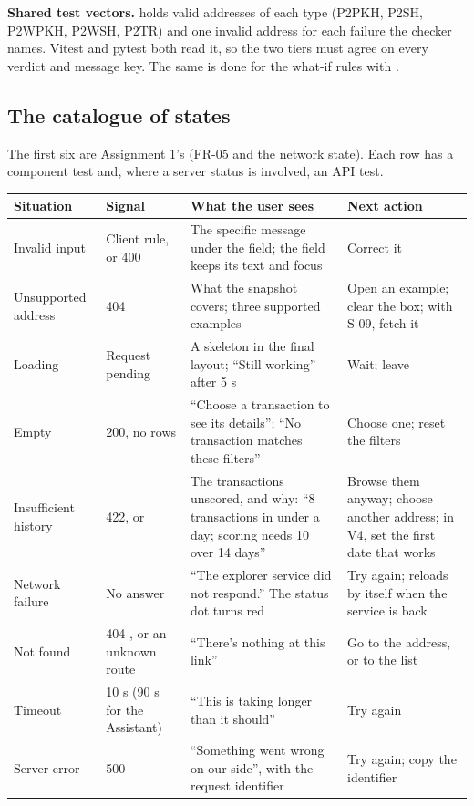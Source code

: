 \textbf{Shared test vectors.}  holds valid addresses of each type
(P2PKH, P2SH, P2WPKH, P2WSH, P2TR) and one invalid address for each failure the checker names.
Vitest and pytest both read it, so the two tiers must agree on every verdict and message key. The
same is done for the what-if rules with .

\subsection{The catalogue of states}
\label{sec:catalogue}

The first six are Assignment 1's (FR-05 and the network state). Each row has a component test and,
where a server status is involved, an API test.

{\small
\begin{longtable}{@{}L{2.9cm}L{2.7cm}L{4.9cm}L{3.6cm}@{}}
\toprule
\textbf{Situation} & \textbf{Signal} & \textbf{What the user sees} & \textbf{Next action} \\
\midrule
\endhead
Invalid input & Client rule, or 400 & The specific message under the field; the field keeps its text and focus & Correct it \\
Unsupported address & 404  & What the snapshot covers; three supported examples & Open an example; clear the box; with S-09, fetch it \\
Loading & Request pending & A skeleton in the final layout; ``Still working'' after 5 s & Wait; leave \\
Empty & 200, no rows & ``Choose a transaction to see its details''; ``No transaction matches these filters'' & Choose one; reset the filters \\
Insufficient history & 422, or  & The transactions unscored, and why: ``8 transactions in under a day; scoring needs 10 over 14 days'' & Browse them anyway; choose another address; in V4, set the first date that works \\
Network failure & No answer & ``The explorer service did not respond.'' The status dot turns red & Try again; reloads by itself when the service is back \\
Not found & 404 , or an unknown route & ``There's nothing at this link'' & Go to the address, or to the list \\
Timeout & 10 s (90 s for the Assistant) & ``This is taking longer than it should'' & Try again \\
Server error & 500 & ``Something went wrong on our side'', with the request identifier & Try again; copy the identifier \\

\end{longtable}}
